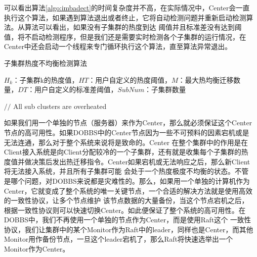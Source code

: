 可以看出算法\ref{algo:imbadect}的时间复杂度并不高，在实际情况中，Center会一直执行这个算法，如果遇到算法退出或者终止，它将自动检测问题并重新启动检测算法。从算法可以看出，如果没有子集群的热度到达
阈值并且标准差没有达到阈值，将不启动检测程序，但是我们还是需要实时检测各个子集群的运行情况，在Center中还会启动一个线程来专门循环执行这个算法，直至算法异常退出。

\begin{algorithm}
    \caption{子集群热度不均衡检测算法}
    \label{algo:imbadect}
    \begin{algorithmic}[1] %
    \Require $H_k$：子集群k的热度值，$HT$：用户自定义的热度阈值，$M$：最大热均衡迁移数量，$DT$：用户自定义的标准差阈值，$SubNum$：子集群数量
    
          \State $//$ All sub clusters are overheated
          \EndIf
        \EndWhile
      \EndIf
    \EndWhile
    \end{algorithmic}
\end{algorithm}

如果我们用一个单独的节点（服务器）来作为Center，那么就必须保证这个Center节点的高可用性。如果DOBBS中的Center节点因为一些不可预料的因素宕机或是无法连通，那么对于整个系统来说将是致命的。Center
在整个集群中的作用是在Client接入系统是向Client分配较冷的一个子集群，还有就是收集每个子集群的热度值并做决策后发出热迁移指令。Center如果宕机或无法响应之后，那么新Client将无法接入系统，并且所有子集群可能
会处于一个热度极度不均衡的状态。不管是哪个问题，对DOBBS来说都是灾难性的。那么，如果用一个单独的计算机作为Center，它就变成了整个系统的唯一关键节点，一个合适的解决方法就是使用高效的一致性协议，让多个节点维护
该节点数据的大量备份，当这个节点宕机之后，根据一致性协议则可以快速切换Center。如此便保证了整个系统的高可用性。在DOBBS中，我们不再使用一个单独的节点作为Center，而是使用Raft\cite{ongaro2014search}这个
一致性协议，我们让集群中的某个Monitor作为Raft中的leader，同样也是Center，而其他Monitor用作备份节点，一旦这个leader宕机了，那么Raft将快速选举出一个Monitor作为Center。


